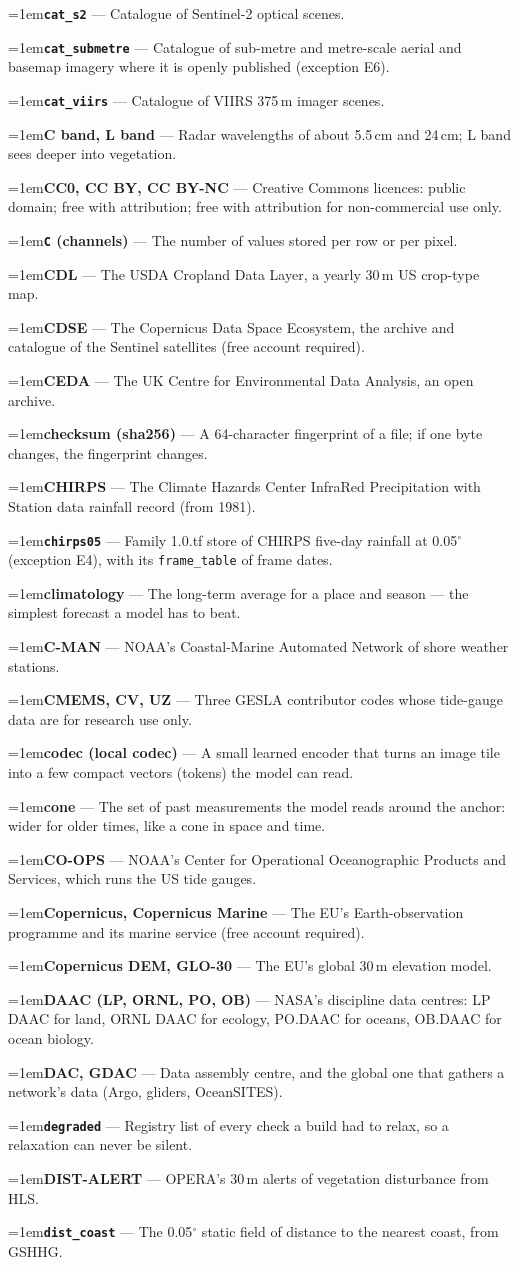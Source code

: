 \documentclass[10pt]{article}
\newcommand{\code}[1]{\texttt{#1}}
\newcommand{\gl}[2]{\par\hangindent=1em\hangafter=1\textbf{#1} --- #2\par}
\begin{document}
\gl{\code{cat\_s2}}{Catalogue of Sentinel-2 optical scenes.}
\gl{\code{cat\_submetre}}{Catalogue of sub-metre and metre-scale aerial and basemap imagery where it is openly published (exception E6).}
\gl{\code{cat\_viirs}}{Catalogue of VIIRS 375\,m imager scenes.}
\gl{C band, L band}{Radar wavelengths of about 5.5\,cm and 24\,cm; L band sees deeper into vegetation.}
\gl{CC0, CC BY, CC BY-NC}{Creative Commons licences: public domain; free with attribution; free with attribution for non-commercial use only.}
\gl{\code{C} (channels)}{The number of values stored per row or per pixel.}
\gl{CDL}{The USDA Cropland Data Layer, a yearly 30\,m US crop-type map.}
\gl{CDSE}{The Copernicus Data Space Ecosystem, the archive and catalogue of the Sentinel satellites (free account required).}
\gl{CEDA}{The UK Centre for Environmental Data Analysis, an open archive.}
\gl{checksum (sha256)}{A 64-character fingerprint of a file; if one byte changes, the fingerprint changes.}
\gl{CHIRPS}{The Climate Hazards Center InfraRed Precipitation with Station data rainfall record (from 1981).}
\gl{\code{chirps05}}{Family 1.0.tf store of CHIRPS five-day rainfall at 0.05$^\circ$ (exception E4), with its \code{frame\_table} of frame dates.}
\gl{climatology}{The long-term average for a place and season --- the simplest forecast a model has to beat.}
\gl{C-MAN}{NOAA's Coastal-Marine Automated Network of shore weather stations.}
\gl{CMEMS, CV, UZ}{Three GESLA contributor codes whose tide-gauge data are for research use only.}
\gl{codec (local codec)}{A small learned encoder that turns an image tile into a few compact vectors (tokens) the model can read.}
\gl{cone}{The set of past measurements the model reads around the anchor: wider for older times, like a cone in space and time.}
\gl{CO-OPS}{NOAA's Center for Operational Oceanographic Products and Services, which runs the US tide gauges.}
\gl{Copernicus, Copernicus Marine}{The EU's Earth-observation programme and its marine service (free account required).}
\gl{Copernicus DEM, GLO-30}{The EU's global 30\,m elevation model.}
\gl{DAAC (LP, ORNL, PO, OB)}{NASA's discipline data centres: LP DAAC for land, ORNL DAAC for ecology, PO.DAAC for oceans, OB.DAAC for ocean biology.}
\gl{DAC, GDAC}{Data assembly centre, and the global one that gathers a network's data (Argo, gliders, OceanSITES).}
\gl{\code{degraded}}{Registry list of every check a build had to relax, so a relaxation can never be silent.}
\gl{DIST-ALERT}{OPERA's 30\,m alerts of vegetation disturbance from HLS.}
\gl{\code{dist\_coast}}{The 0.05$^\circ$ static field of distance to the nearest coast, from GSHHG.}
\end{document}
